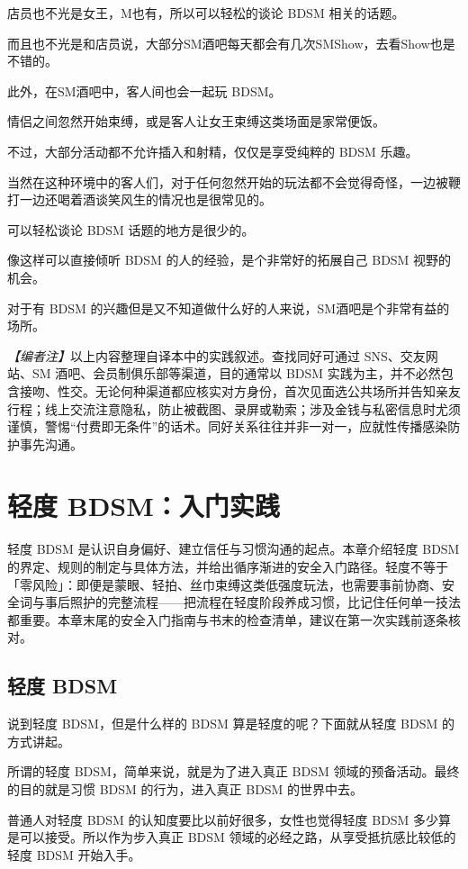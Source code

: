 \documentclass[12pt,UTF8]{ctexbook}
\begin{document}
店员也不光是女王，M也有，所以可以轻松的谈论 BDSM 相关的话题。

而且也不光是和店员说，大部分SM酒吧每天都会有几次SMShow，去看Show也是不错的。

此外，在SM酒吧中，客人间也会一起玩 BDSM。

情侣之间忽然开始束缚，或是客人让女王束缚这类场面是家常便饭。

不过，大部分活动都不允许插入和射精，仅仅是享受纯粹的 BDSM 乐趣。

当然在这种环境中的客人们，对于任何忽然开始的玩法都不会觉得奇怪，一边被鞭打一边还喝着酒谈笑风生的情况也是很常见的。

可以轻松谈论 BDSM 话题的地方是很少的。

像这样可以直接倾听 BDSM 的人的经验，是个非常好的拓展自己 BDSM 视野的机会。

对于有 BDSM 的兴趣但是又不知道做什么好的人来说，SM酒吧是个非常有益的场所。

\noindent\textit{【编者注】}以上内容整理自译本中的实践叙述。查找同好可通过 SNS、交友网站、SM 酒吧、会员制俱乐部等渠道，目的通常以 BDSM 实践为主，并不必然包含接吻、性交。无论何种渠道都应核实对方身份，首次见面选公共场所并告知亲友行程；线上交流注意隐私，防止被截图、录屏或勒索；涉及金钱与私密信息时尤须谨慎，警惕“付费即无条件”的话术。同好关系往往并非一对一，应就性传播感染防护事先沟通。

\chapter{轻度 BDSM：入门实践}

轻度 BDSM 是认识自身偏好、建立信任与习惯沟通的起点。本章介绍轻度 BDSM 的界定、规则的制定与具体方法，并给出循序渐进的安全入门路径。轻度不等于「零风险」：即便是蒙眼、轻拍、丝巾束缚这类低强度玩法，也需要事前协商、安全词与事后照护的完整流程——把流程在轻度阶段养成习惯，比记住任何单一技法都重要。本章末尾的安全入门指南与书末的检查清单，建议在第一次实践前逐条核对。

\section{轻度 BDSM}

说到轻度 BDSM，但是什么样的 BDSM 算是轻度的呢？下面就从轻度 BDSM 的方式讲起。

所谓的轻度 BDSM，简单来说，就是为了进入真正 BDSM 领域的预备活动。最终的目的就是习惯 BDSM 的行为，进入真正 BDSM 的世界中去。

普通人对轻度 BDSM 的认知度要比以前好很多，女性也觉得轻度 BDSM 多少算是可以接受。所以作为步入真正 BDSM 领域的必经之路，从享受抵抗感比较低的轻度 BDSM 开始入手。
\end{document}

